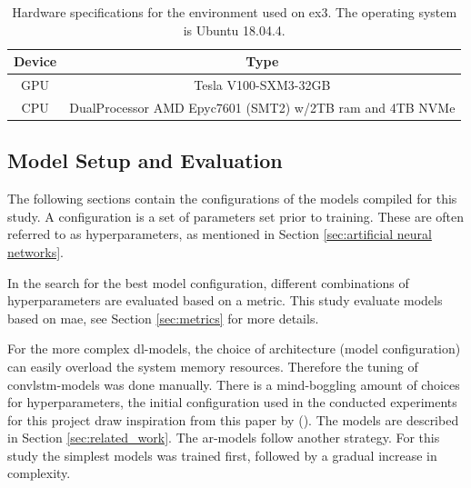 \begin{table}[ht]
    \centering
    \begin{tabular}{c|c}
        Device &  Type  \\ \hline
        GPU & Tesla V100-SXM3-32GB \\
        CPU & DualProcessor AMD Epyc7601 (SMT2) w/2TB ram and 4TB NVMe 
    \end{tabular}
    \caption{Hardware specifications for the environment used on \acrshort{ex3}. The operating system is Ubuntu 18.04.4.}
    \label{tab:hardware_ex3}
\end{table}
\subsection{Model Setup and Evaluation}
The following sections contain the configurations of the models compiled for this study. A configuration is a set of parameters set prior to training. These are often referred to as hyperparameters, as mentioned in Section \ref{sec:artificial neural networks}.

In the search for the best model configuration, different combinations of hyperparameters are evaluated based on a metric. %
This study evaluate models based on \acrfull{mae}, see Section \ref{sec:metrics} for more details.

For the more complex \acrshort{dl}-models, the choice of architecture (model configuration) can easily overload the system memory resources. Therefore the tuning of \acrshort{convlstm}-models was done manually. There is a mind-boggling amount of choices for hyperparameters, the initial configuration used in the conducted experiments for this project draw inspiration from this paper by \citeauthor{SunAirLSTM} (\citeyear{SunAirLSTM}).
The models are described in Section \ref{sec:related_work}.
The \acrshort{ar}-models follow another strategy. For this study the simplest models was trained first, followed by a gradual increase in complexity.

